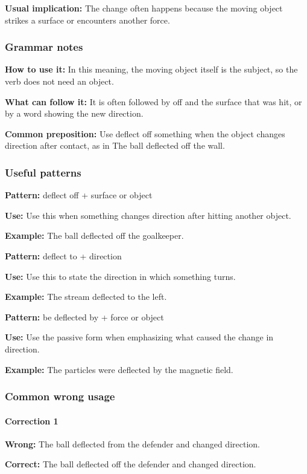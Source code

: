 \documentclass[11pt]{article}
\begin{document}
\textbf{Usual implication:} The change often happens because the moving object strikes a surface or encounters another force.

\subsubsection{Grammar notes}
\textbf{How to use it:} In this meaning, the moving object itself is the subject, so the verb does not need an object.

\textbf{What can follow it:} It is often followed by off and the surface that was hit, or by a word showing the new direction.

\textbf{Common preposition:} Use deflect off something when the object changes direction after contact, as in The ball deflected off the wall.

\subsubsection{Useful patterns}
\textbf{Pattern:} deflect off + surface or object

\textbf{Use:} Use this when something changes direction after hitting another object.

\textbf{Example:} The ball deflected off the goalkeeper.

\textbf{Pattern:} deflect to + direction

\textbf{Use:} Use this to state the direction in which something turns.

\textbf{Example:} The stream deflected to the left.

\textbf{Pattern:} be deflected by + force or object

\textbf{Use:} Use the passive form when emphasizing what caused the change in direction.

\textbf{Example:} The particles were deflected by the magnetic field.

\subsubsection{Common wrong usage}
\paragraph{Correction 1}
\textbf{Wrong:} The ball deflected from the defender and changed direction.

\textbf{Correct:} The ball deflected off the defender and changed direction.
\end{document}
